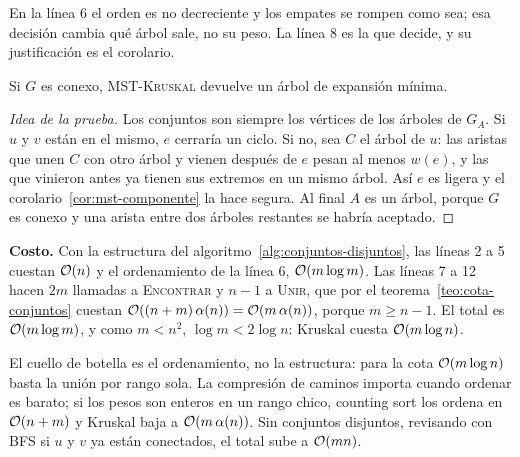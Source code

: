 \documentclass[11pt,letterpaper]{article}
\begin{document}
En la línea 6 el orden es no decreciente y los empates se rompen como
sea; esa decisión cambia qué árbol sale, no su peso. La línea 8 es la
que decide, y su justificación es el corolario.

\begin{proposicion}
  \label{prop:kruskal-mst}
  Si $G$ es conexo, \textsc{MST-Kruskal} devuelve un árbol de
  expansión mínima.
\end{proposicion}

\begin{proof}[Idea de la prueba]
  Los conjuntos son siempre los vértices de los árboles de $G_A$. Si
  $u$ y $v$ están en el mismo, $e$ cerraría un ciclo. Si no, sea $C$ el
  árbol de $u$: las aristas que unen $C$ con otro árbol y vienen
  después de $e$ pesan al menos $w(e)$, y las que vinieron antes ya
  tienen sus extremos en un mismo árbol. Así $e$ es ligera y el
  corolario~\ref{cor:mst-componente} la hace segura. Al final $A$ es un
  árbol, porque $G$ es conexo y una arista entre dos árboles restantes
  se habría aceptado.
\end{proof}

\textbf{Costo.} Con la estructura del
algoritmo~\ref{alg:conjuntos-disjuntos}, las líneas 2 a 5 cuestan
$\mathcal{O}\!\left(n\right)$ y el ordenamiento de la línea 6, $\mathcal{O}\!\left(m \log m\right)$. Las
líneas 7 a 12 hacen $2m$ llamadas a \textsc{Encontrar} y $n - 1$ a
\textsc{Unir}, que por el teorema~\ref{teo:cota-conjuntos} cuestan
$\mathcal{O}\!\left((n + m)\,\alpha(n)\right) = \mathcal{O}\!\left(m\,\alpha(n)\right)$, porque $m \ge n - 1$.
El total es $\mathcal{O}\!\left(m \log m\right)$, y como $m < n^2$, $\log m < 2 \log n$:
Kruskal cuesta $\mathcal{O}\!\left(m \log n\right)$.

El cuello de botella es el ordenamiento, no la estructura: para la
cota $\mathcal{O}\!\left(m \log n\right)$ basta la unión por rango sola. La compresión de
caminos importa cuando ordenar es barato; si los pesos son enteros en
un rango chico, counting sort los ordena en $\mathcal{O}\!\left(n + m\right)$ y Kruskal
baja a $\mathcal{O}\!\left(m\,\alpha(n)\right)$. Sin conjuntos disjuntos, revisando con
BFS si $u$ y $v$ ya están conectados, el total sube a $\mathcal{O}\!\left(mn\right)$.
\end{document}
